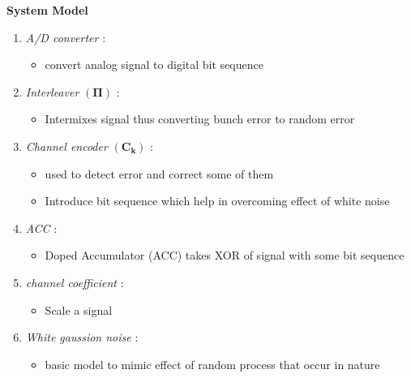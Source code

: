 \documentclass{beamer}
\providecommand{\brak}[1]{\ensuremath{\left(#1\right)}}
\begin{document}
\begin{frame}{\textbf{System Model}}
    \begin{enumerate}
    \setlength\itemsep{0.4em}
        \item \textit{A/D converter} : 
        \begin{itemize}
            \item convert analog signal to digital bit sequence
        \end{itemize}
        \item \textit{Interleaver} \brak{\mathbf{\Pi}} :
        \begin{itemize}
            \item Intermixes signal thus converting bunch error to random error
        \end{itemize}
        \item \textit{ Channel encoder} \brak{\mathbf{C_k}} :
        \begin{itemize}
            \item used to detect error and correct some of them
            \item Introduce bit sequence which help in overcoming effect of white noise
        \end{itemize}
        \item \textit{ACC} :
        \begin{itemize}
            \item Doped Accumulator (ACC) takes XOR of signal with some bit sequence
        \end{itemize}
        \item \textit{channel coefficient} :
        \begin{itemize}
            \item Scale a signal
        \end{itemize}
        \item \textit{White gaussion noise} :
        \begin{itemize}
            \item basic model to mimic effect of random process that occur in nature
        \end{itemize}
    \end{enumerate}
\end{frame}
\end{document}
